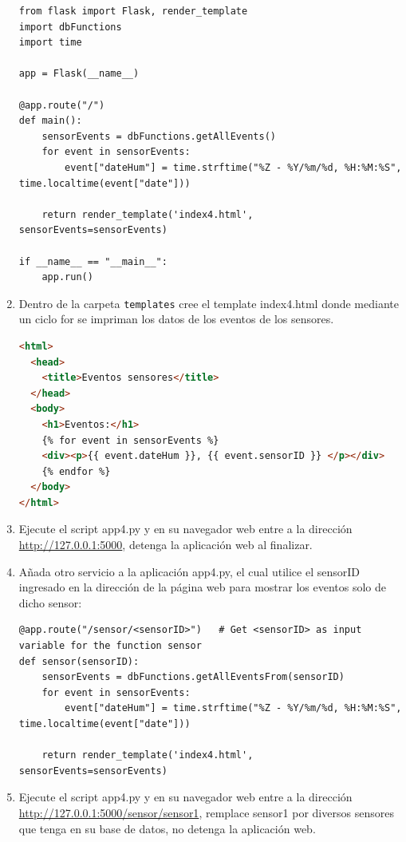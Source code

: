 \documentclass[10pt,letterpaper]{article}
\begin{document}
\begin{enumerate}
\begin{lstlisting}[style=myCustomPythonStyle]
from flask import Flask, render_template
import dbFunctions
import time

app = Flask(__name__)

@app.route("/")
def main():
    sensorEvents = dbFunctions.getAllEvents()
    for event in sensorEvents:
        event["dateHum"] = time.strftime("%Z - %Y/%m/%d, %H:%M:%S", time.localtime(event["date"]))

    return render_template('index4.html', sensorEvents=sensorEvents)

if __name__ == "__main__":
    app.run()
\end{lstlisting}

\item Dentro de la carpeta \verb|templates| cree el template index4.html donde mediante un ciclo for se impriman los datos de los eventos de los sensores. 

\begin{lstlisting}[language=html,basicstyle=\footnotesize,frame=tb,columns=fullflexible]
<html>
  <head>
    <title>Eventos sensores</title>
  </head>
  <body>
    <h1>Eventos:</h1>
    {% for event in sensorEvents %}
    <div><p>{{ event.dateHum }}, {{ event.sensorID }} </p></div>
    {% endfor %}
  </body>
</html>
\end{lstlisting}

\item Ejecute el script app4.py y en su navegador web entre a la dirección \url{http://127.0.0.1:5000}, detenga la aplicación web al finalizar. 

\item Añada otro servicio a la aplicación app4.py, el cual utilice el sensorID ingresado en la dirección de la página web para mostrar los eventos solo de dicho sensor:

\begin{lstlisting}[style=myCustomPythonStyle]
@app.route("/sensor/<sensorID>")   # Get <sensorID> as input variable for the function sensor
def sensor(sensorID):
    sensorEvents = dbFunctions.getAllEventsFrom(sensorID)
    for event in sensorEvents:
        event["dateHum"] = time.strftime("%Z - %Y/%m/%d, %H:%M:%S", time.localtime(event["date"]))

    return render_template('index4.html', sensorEvents=sensorEvents)
\end{lstlisting}

\item Ejecute el script app4.py y en su navegador web entre a la dirección \url{http://127.0.0.1:5000/sensor/sensor1}, remplace sensor1 por diversos sensores que tenga en su base de datos, no detenga la aplicación web. 


\end{enumerate}
\end{document}

